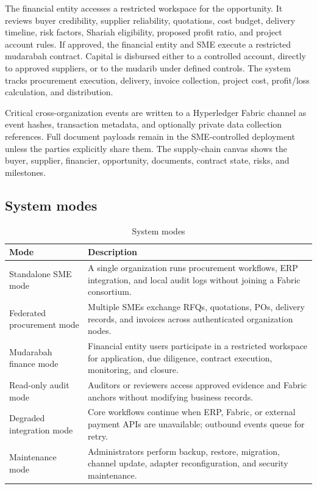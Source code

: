 \documentclass[11pt,a4paper]{article}
\begin{document}
The financial entity accesses a restricted workspace for the opportunity. It reviews buyer credibility, supplier reliability, quotations, cost budget, delivery timeline, risk factors, Shariah eligibility, proposed profit ratio, and project account rules. If approved, the financial entity and SME execute a restricted mudarabah contract. Capital is disbursed either to a controlled account, directly to approved suppliers, or to the mudarib under defined controls. The system tracks procurement execution, delivery, invoice collection, project cost, profit/loss calculation, and distribution.

Critical cross-organization events are written to a Hyperledger Fabric channel as event hashes, transaction metadata, and optionally private data collection references. Full document payloads remain in the SME-controlled deployment unless the parties explicitly share them. The supply-chain canvas shows the buyer, supplier, financier, opportunity, documents, contract state, risks, and milestones.

\subsection{System modes}
\begin{table}[h]
\centering
\begin{tabularx}{\textwidth}{@{}p{}X@{}}
\toprule
Mode & Description \\
\midrule
Standalone SME mode & A single organization runs procurement workflows, ERP integration, and local audit logs without joining a Fabric consortium. \\
Federated procurement mode & Multiple SMEs exchange RFQs, quotations, POs, delivery records, and invoices across authenticated organization nodes. \\
Mudarabah finance mode & Financial entity users participate in a restricted workspace for application, due diligence, contract execution, monitoring, and closure. \\
Read-only audit mode & Auditors or reviewers access approved evidence and Fabric anchors without modifying business records. \\
Degraded integration mode & Core workflows continue when ERP, Fabric, or external payment APIs are unavailable; outbound events queue for retry. \\
Maintenance mode & Administrators perform backup, restore, migration, channel update, adapter reconfiguration, and security maintenance. \\
\bottomrule
\end{tabularx}
\caption{System modes}
\end{table}
\end{document}
